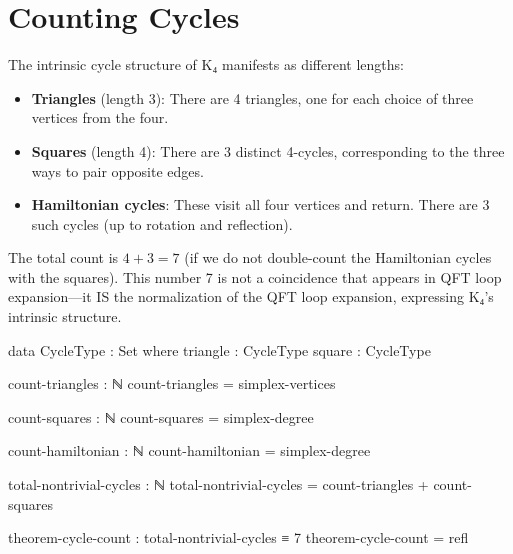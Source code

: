 \documentclass[11pt,a4paper]{book}
\begin{document}
\section{Counting Cycles}

The intrinsic cycle structure of K₄ manifests as different lengths:
\begin{itemize}
\item \textbf{Triangles} (length 3): There are 4 triangles, one for each choice of three 
  vertices from the four.
\item \textbf{Squares} (length 4): There are 3 distinct 4-cycles, corresponding to the 
  three ways to pair opposite edges.
\item \textbf{Hamiltonian cycles}: These visit all four vertices and return. There are 
  3 such cycles (up to rotation and reflection).
\end{itemize}

The total count is $4 + 3 = 7$ (if we do not double-count the Hamiltonian cycles with the 
squares). This number 7 is not a coincidence that appears in QFT loop expansion—it IS the 
normalization of the QFT loop expansion, expressing K₄'s intrinsic structure.

\begin{code}
data CycleType : Set where
  triangle : CycleType
  square   : CycleType

count-triangles : ℕ
count-triangles = simplex-vertices

count-squares : ℕ
count-squares = simplex-degree

count-hamiltonian : ℕ
count-hamiltonian = simplex-degree

total-nontrivial-cycles : ℕ
total-nontrivial-cycles = count-triangles + count-squares

theorem-cycle-count : total-nontrivial-cycles ≡ 7
theorem-cycle-count = refl
\end{code}
\end{document}

